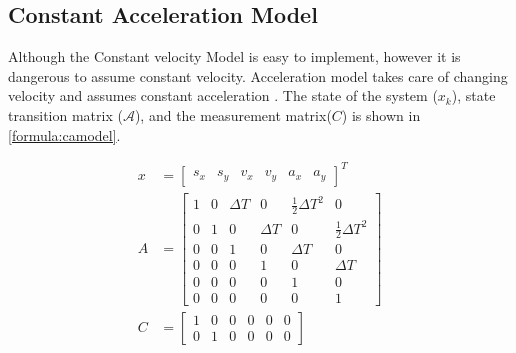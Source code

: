 \subsection{Constant Acceleration Model}
Although the Constant velocity Model is easy to implement, however it is dangerous to assume constant velocity. Acceleration model takes care of changing velocity and assumes constant acceleration \cite{Schubert2008}. The state of the system ($x_k$), state transition matrix ($\mathcal{A}$), and the measurement matrix($C$) is shown in \eqref{formula:camodel}.

\begin{equation*}
\label{formula:camodel}
\begin{split}
x&= \left[\begin{matrix}
s_x & s_y & v_x & v_y & a_x & a_y
\end{matrix}\right]^{T}\\
A&= \left[\begin{matrix}
1 & 0 & \Delta T & 0 & \frac{1}{2}\Delta T^2 & 0\\
0 & 1 & 0 & \Delta T & 0 & \frac{1}{2}\Delta T^2 \\
0 & 0 & 1 & 0 & \Delta T & 0\\
0 & 0 & 0 & 1 & 0 & \Delta T\\
0 & 0 & 0 & 0 & 1 & 0\\
0 & 0 & 0 & 0 & 0 & 1
\end{matrix}\right] \\
C&= \left[\begin{matrix}
1 & 0 & 0 & 0 & 0 & 0\\
0 & 1 & 0 & 0 & 0 & 0
\end{matrix}\right]
\end{split}
\end{equation*}

